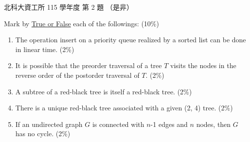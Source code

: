 \begin{pastexam}[label={px:ntut-115-ci-02}]{北科大資工所 115 學年度 第 2 題}
（是非）

Mark by \underline{True or False} each of the followings: (10\%)
\begin{enumerate}[label=(\arabic*)]
\item The operation insert on a priority queue realized by a sorted list can be done in linear
time. (2\%)
\item It is possible that the preorder traversal of a tree $T$ visits the nodes in the reverse
order of the postorder traversal of $T$. (2\%)
\item A subtree of a red-black tree is itself a red-black tree. (2\%)
\item There is a unique red-black tree associated with a given (2, 4) tree. (2\%)
\item If an undirected graph $G$ is connected with $n$-1 edges and $n$ nodes, then $G$ has no
cycle. (2\%)
\end{enumerate}
\end{pastexam}

